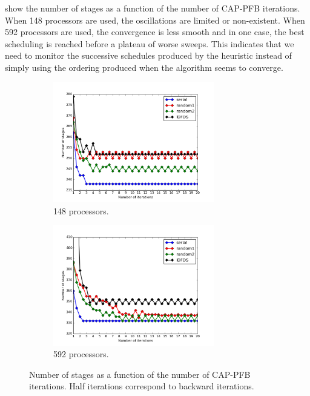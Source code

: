 \documentclass[letterpaper]{article}
\renewcommand{\(}{\left(}
\renewcommand{\)}{\right)}
\renewcommand{\[}{\left[}
\renewcommand{\]}{\right]}
\begin{document}
 show the number of stages
as a function of the number of CAP-PFB iterations. When 148 processors are used,
the oscillations are limited or non-existent. When 592 processors are used, the
convergence is less smooth and in one case, the best scheduling is reached
before a plateau of worse sweeps. This indicates that we need to monitor the
successive schedules produced by the heuristic instead of simply using the
ordering produced when the algorithm seems to converge.
\begin{figure}[H]
  \begin{subfigure}[b]{.5\textwidth}
    \centering
    \includegraphics[width=7cm]{convergence_central_148}
    \caption{148 processors.}
  \label{convergence_central_148}
  \end{subfigure}
  \begin{subfigure}[b]{.5\textwidth}
    \centering
    \includegraphics[width=7cm]{convergence_central_592}
    \caption{592 processors.}
  \label{convergence_central_592}
  \end{subfigure}
  \caption{Number of stages as a function of the number of CAP-PFB iterations.
  Half iterations correspond to backward iterations.}
\end{figure}
\end{document}

